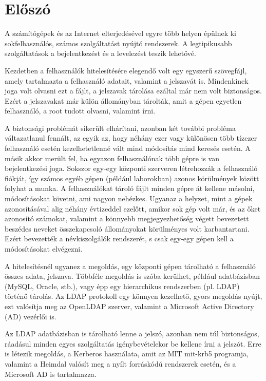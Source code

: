 \section{Előszó}
A számítógépek és az Internet elterjedésével egyre több helyen épülnek ki sokfelhasználós, számos szolgáltatást nyújtó
rendszerek. A legtipikusabb szolgáltatások a bejelentkezést és a levelezést teszik lehetővé.

Kezdetben a felhasználók hitelesítésére elegendő volt egy egyszerű szövegfájl, amely tartalmazta a felhasználó
adatait, valamint a jelszavát is. Mindenkinek joga volt olvasni ezt a fájlt, a jelszavak tárolása ezáltal már nem volt
biztonságos. Ezért a jelszavakat már külön állományban tárolták, amit a gépen egyetlen felhasználó, a root tudott
olvasni, valamint írni.

A biztonsági problémát sikerült elhárítani, azonban két további probléma váltazatlanul fennált, az egyik az, hogy
néhány ezer vagy különösen több tízezer felhasználó esetén kezelhetetlenné vált mind módosítás mind keresés esetén. A
másik akkor merült fel, ha egyazon felhasználónak több gépre is van bejelentkezési joga. Sokszor egy-egy központi
szerveren létrehozzák a felhasználó fiókját, így számos egyéb gépen (például laborokban) azonos körülmények között
folyhat a munka. A felhasználókat tároló fájlt minden gépre át kellene másolni, módosításokat követni, ami nagyon
nehézkes. Ugyanaz a helyzet, mint a gépek azonosításával alig néhány évtizeddel ezelőtt, amikor sok gép volt már, és
az őket azonosító számokat, valamint a könnyebb megjegyezhetőség végett bevezetett beszédes neveket összekapcsoló
állományokat körülményes volt karbantartani. Ezért bevezették a névkiszolgálók rendszerét, s csak egy-egy gépen kell a
módosításokat elvégezni.

A hitelesítésnél ugyanez a megoldás, egy központi gépen tárolható a felhasználó összes adata, jelszava. Többféle
megoldás is szóba kerülhet, például adatbázisban (MySQL, Oracle, stb.), vagy épp egy hierarchikus
rendszerben  (pl. LDAP) történő tárolás. Az LDAP protokoll egy könnyen kezelhető, gyors megoldás nyújt, ezt valósítja
meg az OpenLDAP szerver, valamint a Microsoft Active Directory (AD) vezérlői is. 

Az LDAP adatbázisban is tárolható lenne a jelszó, azonban nem túl biztonságos, ráadásul minden egyes szolgáltatás
igénybevételekor be kellene írni a jelszót. Erre is létezik megoldás, a Kerberos használata, amit az MIT mit-krb5
programja, valamint a Heimdal valósít meg a nyílt forráskódú rendszerek esetén, és a Microsoft AD is tartalmazza.

